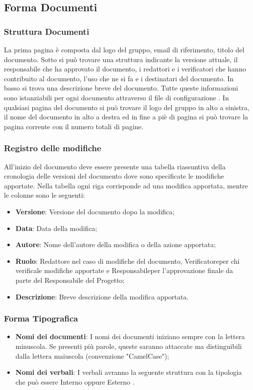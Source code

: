 \subsection{Forma Documenti}
\subsubsection{Struttura Documenti}\label{strutturaDocumenti}
La prima pagina è composta dal logo del gruppo, email di riferimento, titolo del documento.
Sotto si può trovare una struttura indicante la versione attuale, il responsabile che ha approvato il documento, i redattori e i verificatori che hanno contribuito al documento, l'uso che ne si fa e i destinatari del documento.
In basso si trova una descrizione breve del documento.
Tutte queste informazioni sono istanziabili per ogni documento attraverso il file di configurazione .
In qualsiasi pagina del documento si può trovare il logo del gruppo in alto a sinistra, il nome del documento in alto a destra ed in fine a piè di pagina si può trovare la pagina corrente con il numero totali di pagine.

\subsubsection{Registro delle modifiche}\label{Registro}
All’inizio del documento deve essere presente una tabella riassuntiva della cronologia delle versioni del documento dove sono specificate le modifiche apportate.
Nella tabella ogni riga corrisponde ad una modifica apportata, mentre le colonne sono le seguenti:
\begin{itemize}
    \item \textbf{Versione}: Versione del documento dopo la modifica;
    \item \textbf{Data}: Data della modifica;
    \item \textbf{Autore}: Nome dell’autore della modifica o della azione apportata;
    \item \textbf{Ruolo}: Redattore nel caso di modifiche del documento, Verificatore\glo per chi verifica\glo le modifiche apportate e Responsabile\glo per l’approvazione finale da parte del Responsabile del Progetto;
    \item \textbf{Descrizione}: Breve descrizione della modifica apportata.
\end{itemize}

\subsubsection{Forma Tipografica}
\begin{itemize}
  \item \textbf{Nomi dei documenti}: I nomi dei documenti iniziano sempre con la lettera minuscola. Se presenti più parole, queste saranno attaccate ma distinguibili dalla lettera maiuscola (convenzione "CamelCase");
  \item \textbf{Nomi dei verbali}: I verbali avranno la seguente struttura  con la tipologia che può essere Interno  oppure Esterno .
\end{itemize}

